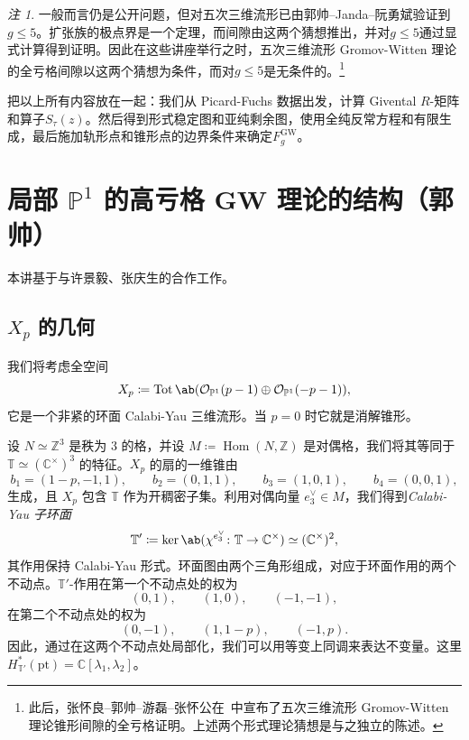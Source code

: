 \documentclass{amsart}
\theoremstyle{definition}
\theoremstyle{remark}
\newtheorem{rmk}[thm]{注}
\theoremstyle{plain}
\theoremstyle{definition}
\theoremstyle{remark}
\newcommand{\C}{\mathbb{C}}
\newcommand{\Z}{\mathbb{Z}}
\renewcommand{\P}{\mathbb{P}}
\newcommand{\mc}[1]{\mathcal{#1}}
\newcommand{\T}{\mathbb{T}}
\newcommand{\mr}[1]{\mathrm{#1}}
\newcommand{\on}[1]{\operatorname{#1}}
\newcommand{\1}{\mathbf{1}}
\newcommand{\2}{\mathbf{2}}
\newcommand{\3}{\mathbf{3}}
\DeclareMathOperator{\Hom}{Hom}
\begin{document}
\begin{rmk}
    一般而言仍是公开问题，但对五次三维流形已由郭帅–Janda–阮勇斌验证到\(g \leq 5\)。扩张族的极点界是一个定理，而间隙由这两个猜想推出，并对\(g \leq 5\)通过显式计算得到证明。因此在这些讲座举行之时，五次三维流形 Gromov-Witten 理论的全亏格间隙以这两个猜想为条件，而对\(g \leq 5\)是无条件的。\footnote{此后，张怀良–郭帅–游磊–张怀公在~\cite{CGYZ2026}中宣布了五次三维流形 Gromov-Witten 理论锥形间隙的全亏格证明。上述两个形式理论猜想是与之独立的陈述。}
\end{rmk}

把以上所有内容放在一起：我们从 Picard-Fuchs 数据出发，计算 Givental \(R\)-矩阵和算子\(S_{\tau}(z)\)。然后得到形式稳定图和亚纯剩余图，使用全纯反常方程和有限生成，最后施加轨形点和锥形点的边界条件来确定\(F_g^{\mr{GW}}\)。


\section{\texorpdfstring{局部 \(\P^1\) 的高亏格 GW 理论的结构}{局部 P1 的高亏格 GW 理论的结构}（郭帅）}%
\label{sec:Structure of higher-genus GW theory of local P1 (Shuai Guo)}

本讲基于与许景毅、张庆生的合作工作。

\subsection{\(X_p\) 的几何}%
\label{sub:The geometry of Xp}

我们将考虑全空间
\[ X_p \coloneqq \on{Tot}\ab(\mc{O}_{\P^1}(p-1) \oplus \mc{O}_{\P^1}(-p-1)), \]
它是一个非紧的环面 Calabi-Yau 三维流形。当 \(p = 0\) 时它就是消解锥形。

设 \(N \simeq \Z^3\) 是秩为 \(3\) 的格，并设 \(M \coloneqq \Hom(N,\Z)\) 是对偶格，我们将其等同于 \(\T \simeq (\C^{\times})^3\) 的特征。\(X_p\) 的扇的一维锥由
\[ b_1 = (1-p,-1,1), \qquad b_2 = (0,1,1), \qquad b_3 = (1,0,1), \qquad b_4 = (0,0,1), \]
生成，且 \(X_p\) 包含 \(\T\) 作为开稠密子集。利用对偶向量 \(e_3^{\vee} \in M\)，我们得到\textit{Calabi-Yau 子环面}
\[ \T' \coloneqq \ker\ab(\chi^{e_3^{\vee}} \colon \T \to \C^{\times}) \simeq (\C^{\times})^2, \]
其作用保持 Calabi-Yau 形式。环面图由两个三角形组成，对应于环面作用的两个不动点。\(\T'\)-作用在第一个不动点处的权为
\[ (0,1), \qquad (1,0), \qquad (-1,-1), \]
在第二个不动点处的权为
\[ (0,-1), \qquad (1,1-p), \qquad (-1,p). \]
因此，通过在这两个不动点处局部化，我们可以用等变上同调来表达不变量。这里 \(H^*_{\T'}(\mr{pt}) = \C[\lambda_1,\lambda_2]\)。
\end{document}
